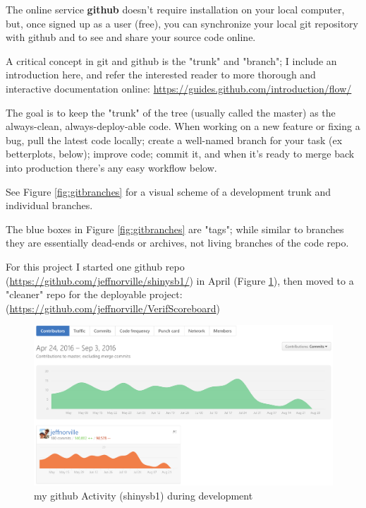 \documentclass[logos,parttoc,morelanguage=french,morelanguage=german,draft]{orsay-memoire}
\begin{document}
The online service \textbf{github} doesn't require installation on your local computer, but, once signed up as a user (free), you can synchronize your local git repository with github and to see and share your source code online.

A critical concept in git and github is the "trunk" and "branch"; I include an introduction here, and refer the interested reader to more thorough and interactive documentation online: 
\href{https://guides.github.com/introduction/flow/}{https://guides.github.com/introduction/flow/}

The goal is to keep the "trunk" of the tree (usually called the master) as the always-clean, always-deploy-able code. When working on a new feature or fixing a bug, pull the latest code locally; create a well-named branch for your task (ex betterplots, below); improve code; commit it, and when it's ready to merge back into production there's any easy workflow below.

See Figure \ref{fig:gitbranches} for a visual scheme of a development trunk and individual branches. 


The blue boxes in Figure \ref{fig:gitbranches} are "tags"; while similar to branches they are essentially dead-ends or archives, not living branches of the code repo.

For this project I started one github repo (\href{https://github.com/jeffnorville/shinysb1/}{https://github.com/jeffnorville/shinysb1/}) in April (Figure \ref{fig:githubactivity}), then moved to a "cleaner" repo for the deployable project: (\href{https://github.com/jeffnorville/VerifScoreboard}{https://github.com/jeffnorville/VerifScoreboard})

\begin{figure}[H]
\centering
\includegraphics[width=0.8\linewidth]{images/githPlotCommitActivity.png}
  \caption{my github Activity (shinysb1) during development}
  \label{fig:githubactivity}
\end{figure}
\end{document}
